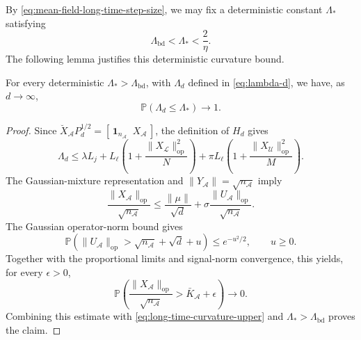 By \eqref{eq:mean-field-long-time-step-size}, we may fix
a deterministic constant $\Lambda_*$ satisfying
\[
    \Lambda_{\mathrm{bd}}<\Lambda_*<\frac2\eta.
\]
The following lemma justifies this deterministic curvature bound.

\begin{lemma}
\label{lem:st-deterministic-curvature-bound}
For every deterministic $\Lambda_*>\Lambda_{\mathrm{bd}}$,
with $\Lambda_d$ defined in \eqref{eq:lambda-d}, we have,
as $d\to\infty$,
\begin{equation}
    \mathbb P(\Lambda_d\leq\Lambda_*)\longrightarrow1.
    \label{eq:st-deterministic-curvature-bound}
\end{equation}
\end{lemma}

\begin{proof}
Since
$\breve X_{\mathcal A}P_d^{1/2}
=[\,\mathbf1_{n_{\mathcal A}}\;\;X_{\mathcal A}\,]$,
the definition of $H_d$ gives
\begin{equation}
    \Lambda_d
    \leq\lambda L_j
       +L_\ell\left(
           1+\frac{\|X_{\mathcal L}\|_{\mathrm{op}}^2}{N}
       \right)
       +\pi L_\ell\left(
           1+\frac{\|X_{\mathcal U}\|_{\mathrm{op}}^2}{M}
       \right).
    \label{eq:long-time-curvature-upper}
\end{equation}
The Gaussian-mixture representation and
$\|Y_{\mathcal A}\|=\sqrt{n_{\mathcal A}}$ imply
\[
    \frac{\|X_{\mathcal A}\|_{\mathrm{op}}}
         {\sqrt{n_{\mathcal A}}}
    \leq
    \frac{\|\mu\|}{\sqrt d}
    +\sigma\frac{\|U_{\mathcal A}\|_{\mathrm{op}}}
                      {\sqrt{n_{\mathcal A}}}.
\]
The Gaussian operator-norm bound
\cite[Theorem~5.32 and Proposition~5.34]{vershynin2012introduction}
gives
\[
    \mathbb P\left(
        \|U_{\mathcal A}\|_{\mathrm{op}}
        >\sqrt{n_{\mathcal A}}+\sqrt d+u
    \right)
    \leq e^{-u^2/2},
    \qquad u\geq0.
\]
Together with the proportional limits and signal-norm convergence,
this yields, for every $\epsilon>0$,
\begin{equation}
    \mathbb P\left(
        \frac{\|X_{\mathcal A}\|_{\mathrm{op}}}
             {\sqrt{n_{\mathcal A}}}
        >\bar K_{\mathcal A}+\epsilon
    \right)\longrightarrow0.
    \label{eq:long-time-design-bound}
\end{equation}
Combining this estimate with
\eqref{eq:long-time-curvature-upper} and
$\Lambda_*>\Lambda_{\mathrm{bd}}$ proves the claim.
\end{proof}

